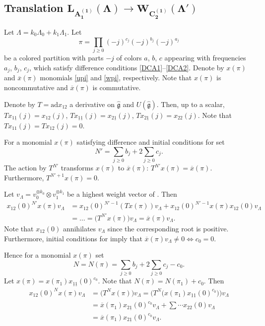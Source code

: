\documentclass[pdftex]{sigma}
\newcommand{\gk}
{\hat{{\mathfrak g}}}
\newcommand{\ox}
{{\overline{x}}}
\numberwithin{equation}{section}
\begin{document}
\subsection[Translation L\_A\_1\^(1)(Lambda)to W\_C\_2\^(1)(Lambda')]{Translation $\boldsymbol{ L_{A_1^{(1)}}(\Lambda)\to W_{C_2^{(1)}}(\Lambda')}$}

Let $\Lambda = k_0 \Lambda_0 + k_1 \Lambda_1$. Let
\[\pi=\prod_{j\geq 0}(-j)^{c_j}(-j)^{b_j}(-j)^{a_j}\]
be a colored partition with parts $-j$ of colors $a$, $b$, $c$ appearing with frequencies $a_j$, $b_j$, $c_j$, which satisfy difference conditions \eqref{DCA1}--\eqref{DCA2}.
Denote by $x(\pi)$ and $\ox(\pi)$ monomials \eqref{upi} and \eqref{wpi}, respectively. Note that $x(\pi)$ is noncommutative and $\ox(\pi)$ is commutative.


Denote by $T=\textrm{ad}  x_{12}$ a derivative on $\gk$ and $U(\gk)$. Then, up to a scalar,
$ T x_{1 \underline{1}}(j)  = x_{1 2}(j)$,
 $T x_{\underline{1} \underline{1}}(j)  = x_{2\underline{1}}(j)$, $
 T x_{2\underline{1}}(j)  = x_{22}(j)$.
Note that
$T x_{1 1}(j) = T x_{1 2}(j)=0$.

For a monomial $x(\pi)$ satisfying difference and initial conditions for  set
\[N'=\sum_{j\geq 0} b_j + 2\sum_{j\geq 0} c_j.\]
The action by $T^{N'}$ transforms $x(\pi)$ to $\ox(\pi)$:
$T^{N'} x(\pi) = \ox (\pi)$.
Furthermore,
$T^{N'+1} x(\pi) = 0$.

Let $v_\Lambda=v_0^{\otimes k_0} \otimes v_1^{\otimes k_1}$ be a highest weight vector of .
Then
\begin{align*}
	x_{12}(0)^{N'} x(\pi) v_\Lambda & = x_{12}(0)^{N'-1} (T x(\pi)) v_\Lambda + x_{12}(0)^{N'-1} x(\pi) x_{12}(0) v_\Lambda \\
	& = \dots= \bigl(T^{N'} x(\pi)\bigr) v_\Lambda= \ox(\pi) v_\Lambda.
\end{align*}
Note that $x_{12}(0)$ annihilates $v_\Lambda$ since the corresponding root is positive.
Furthermore, initial conditions for  imply that
$\ox(\pi) v_\Lambda \neq 0 \Leftrightarrow c_0=0$.

Hence for a monomial $x(\pi)$ set
\[N = N(\pi) =\sum_{j\geq 0} b_j + 2\sum_{j\geq 0} c_j - c_0.\]
Let $x(\pi)=x(\pi_1)x_{\underline{1} \underline{1}}(0)^{c_0}$. Note that $N(\pi) = N(\pi_1) + c_0$.
Then
\begin{align}
x_{12}(0)^N x(\pi) v_\Lambda & =  \bigl(T^N x(\pi)\bigr) v_\Lambda = \bigl(T^N \bigl(x(\pi_1)x_{\underline{1}\underline{1}}(0)^{c_0}\bigr)\bigr) v_\Lambda\nonumber\\
\label{eq2}	& = \ox(\pi_1)x_{2\underline{1}}(0)^{c_0} v_\Lambda + \sum \cdots x_{2 2}(0) v_\Lambda \\
\label{eq3}	& = \ox(\pi_1)x_{2\underline{1}}(0)^{c_0} v_\Lambda.
\end{align}
\end{document}
